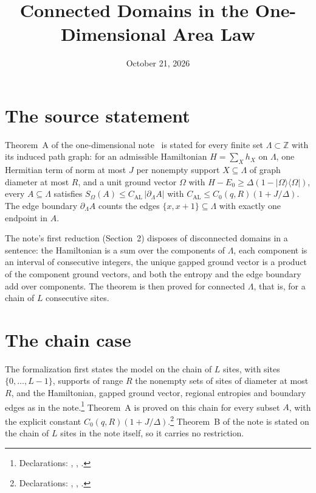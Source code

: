\documentclass{article}
\title{Connected Domains in the One-Dimensional Area Law}
\author{}
\date{October 21, 2026}
\begin{document}
\maketitle
{}

\section{The source statement}

Theorem~A of the one-dimensional note~\cite{TNLean2026OneDimensional} is
stated for every finite set $\Lambda\subset\mathbb Z$ with its induced path
graph: for an admissible Hamiltonian $H=\sum_X h_X$ on $\Lambda$, one Hermitian
term of norm at most $J$ per nonempty support $X\subseteq\Lambda$ of graph
diameter at most $R$, and a unit ground vector $\Omega$ with
$H-E_0\ge\Delta(1-|\Omega\rangle\langle\Omega|)$, every $A\subseteq\Lambda$
satisfies $S_\Omega(A)\le C_{\mathrm{AL}}\,|\partial_\Lambda A|$ with
$C_{\mathrm{AL}}\le C_0(q,R)(1+J/\Delta)$. The edge boundary
$\partial_\Lambda A$ counts the edges $\{x,x+1\}\subseteq\Lambda$ with exactly
one endpoint in $A$.

The note's first reduction (Section~2) disposes of disconnected domains in a
sentence: the Hamiltonian is a sum over the components of $\Lambda$, each
component is an interval of consecutive integers, the unique gapped ground
vector is a product of the component ground vectors, and both the entropy and
the edge boundary add over components. The theorem is then proved for
connected $\Lambda$, that is, for a chain of $L$ consecutive sites.

\section{The chain case}

The formalization first states the model on the chain of $L$ sites, with sites
$\{0,\ldots,L-1\}$, supports of range $R$ the nonempty sets of sites of
diameter at most $R$, and the Hamiltonian, gapped ground vector, regional
entropies and boundary edges as in the note.\footnote{Declarations:
    ,
    ,
    .} Theorem~A is proved on this
chain for every subset $A$, with the explicit constant
$C_0(q,R)(1+J/\Delta)$.\footnote{Declarations:
    ,
    ,
    .} Theorem~B of the note is stated on
the chain of $L$ sites in the note itself, so it carries no restriction.
\end{document}
